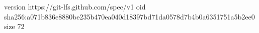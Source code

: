 version https://git-lfs.github.com/spec/v1
oid sha256:a071b836e8880be235b470ea040d18397bd71da0578d7b4b0a6351751a5b2ee0
size 72
